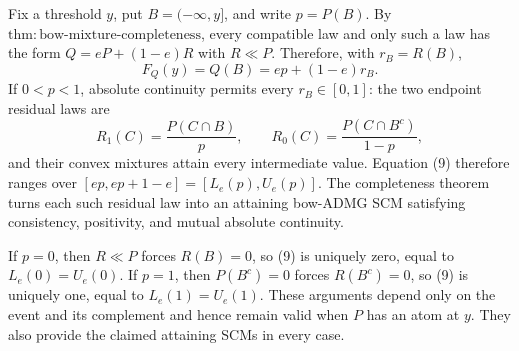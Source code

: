 Fix a threshold \(y\), put \(B=(-\infty,y]\), and write \(p=P(B)\).  By \(\mathrm{thm:bow\text{-}mixture\text{-}completeness}\), every compatible law and only such a law has the form \(Q=eP+(1-e)R\) with \(R\ll P\).  Therefore, with \(r_B=R(B)\),
\[
 F_Q(y)=Q(B)=ep+(1-e)r_B. \tag{9}
\]
If \(0<p<1\), absolute continuity permits every \(r_B\in[0,1]\): the two endpoint residual laws are
\[
 R_1(C)=\frac{P(C\cap B)}{p},\qquad
 R_0(C)=\frac{P(C\cap B^c)}{1-p},
\]
and their convex mixtures attain every intermediate value.  Equation (9) therefore ranges over \([ep,ep+1-e]=[L_e(p),U_e(p)]\).  The completeness theorem turns each such residual law into an attaining bow-ADMG SCM satisfying consistency, positivity, and mutual absolute continuity.

If \(p=0\), then \(R\ll P\) forces \(R(B)=0\), so (9) is uniquely zero, equal to \(L_e(0)=U_e(0)\).  If \(p=1\), then \(P(B^c)=0\) forces \(R(B^c)=0\), so (9) is uniquely one, equal to \(L_e(1)=U_e(1)\).  These arguments depend only on the event and its complement and hence remain valid when \(P\) has an atom at \(y\).  They also provide the claimed attaining SCMs in every case.